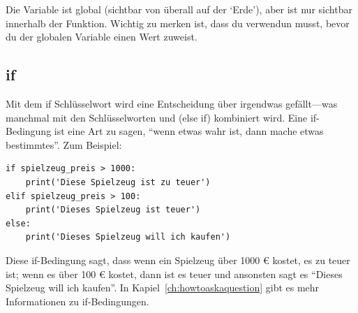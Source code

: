 Die Variable  ist global (sichtbar von überall auf der `Erde'), aber  ist nur sichtbar innerhalb der Funktion. Wichtig zu merken ist, dass du  verwendun musst, bevor du der globalen Variable einen Wert zuweist.

\subsection*{if}

Mit dem if Schlüsselwort wird eine Entscheidung über irgendwas gefällt---was manchmal mit den Schlüsselworten  und  (else if) kombiniert wird. Eine if-Bedingung ist eine Art zu sagen, ``wenn etwas wahr ist, dann mache etwas bestimmtes''. Zum Beispiel:

\begin{Verbatim}[frame=single]
if spielzeug_preis > 1000:
    print('Diese Spielzeug ist zu teuer')
elif spielzeug_preis > 100:
    print('Dieses Spielzeug ist teuer')
else:
    print('Dieses Spielzeug will ich kaufen')
\end{Verbatim}

Diese if-Bedingung sagt, dass wenn ein Spielzeug über 1000 € kostet, es zu teuer ist; wenn es über 100 € kostet, dann ist es teuer und ansonsten sagt es ``Dieses Spielzeug will ich kaufen''. In Kapiel~\ref{ch:howtoaskaquestion} gibt es mehr Informationen zu if-Bedingungen.

